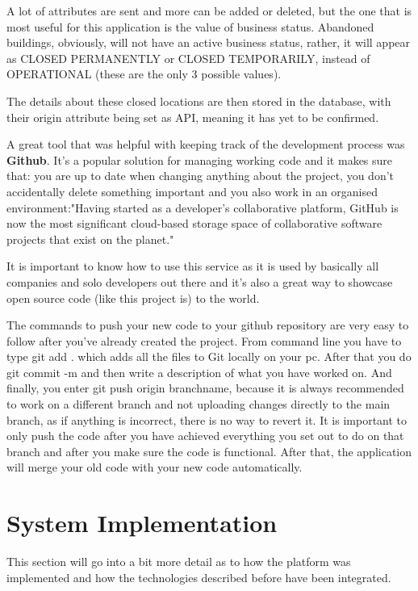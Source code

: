 \documentclass[12pt,a4paper]{report}
\begin{document}
A lot of attributes are sent and more can be added or deleted, but the one that is most useful for this application is the value of business status. Abandoned buildings, obviously, will not have an active business status, rather, it will appear as CLOSED PERMANENTLY or CLOSED TEMPORARILY, instead of OPERATIONAL (these are the only 3 possible values).

The details about these closed locations are then stored in the database, with their origin attribute being set as API, meaning it has yet to be confirmed.

A great tool that was helpful with keeping track of the development process was \textbf{Github}. It's a popular solution for managing working code and it makes sure that: you are up to date when changing anything about the project, you don't accidentally delete something important and you also work in an organised environment:"Having started as a developer's collaborative platform, GitHub is now the most significant cloud-based storage space of collaborative software projects that exist on the planet."~\cite{gitHub}

It is important to know how to use this service as it is used by basically all companies and solo developers out there and it's also a great way to showcase open source code (like this project is) to the world.

The commands to push your new code to your github repository are very easy to follow after you've already created the project. From command line you have to type git add . which adds all the files to Git locally on your pc. After that you do git commit -m and then write a description of what you have worked on. And finally, you enter git push origin branchname, because it is always recommended to work on a different branch and not uploading changes directly to the main branch, as if anything is incorrect, there is no way to revert it. It is important to only push the code after you have achieved everything you set out to do on that branch and after you make sure the code is functional. After that, the application will merge your old code with your new code automatically.

\section{System Implementation}

This section will go into a bit more detail as to how the platform was implemented and how the technologies described before have been integrated.
\end{document}
